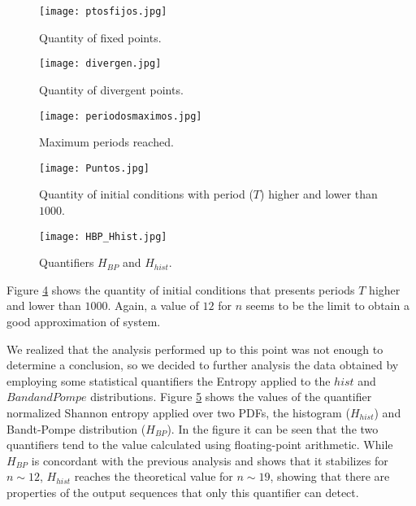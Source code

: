 \documentclass[conference]{IEEEtran}
\begin{document}
\begin{figure}
    \centering
    \texttt{[image: ptosfijos.jpg]}\\
    \caption{Quantity of fixed points.}
    \label{puntosfijos}

\end{figure}

\begin{figure}
    \centering
    \texttt{[image: divergen.jpg]}\\
    \caption{Quantity of divergent points.}\label{puntosdivergentes}

\end{figure}

\begin{figure}
    \centering
        \texttt{[image: periodosmaximos.jpg]}\\
    \caption{Maximum periods reached.}\label{periodosmaximos}

\end{figure}




\begin{figure}
    \centering
        \texttt{[image: Puntos.jpg]}\\
    \caption{Quantity of initial conditions with period ($T$) higher and lower than $1000$.}\label{puntos}

\end{figure}



\begin{figure}
    \centering
        \texttt{[image: HBP\_Hhist.jpg]}\\
    \caption{Quantifiers $H_{BP}$  and $H_{hist}$.}\label{HBPHhist}

\end{figure}


Figure \ref{puntos} shows the quantity of initial conditions that
presents periods $T$ higher and lower than $1000$. Again, a value
of $12$ for $n$ seems to be the limit to obtain a good
approximation of system.

%
We realized that the analysis performed up to this point was not
enough to determine a conclusion, so we decided to further
analysis the data obtained by employing some statistical
quantifiers the Entropy applied to the $hist$ and $Band and Pompe$
distributions. Figure \ref{HBPHhist} shows the values of the
quantifier normalized Shannon entropy applied over two PDFs, the
histogram ($H_{hist}$) and Bandt-Pompe distribution ($H_{BP}$). In
the figure it can be seen that the two quantifiers tend to the
value calculated using floating-point arithmetic. While $H_{BP}$
is concordant with the previous analysis and shows that it
stabilizes for $n \sim 12$, $H_{hist}$ reaches the theoretical
value for $n \sim 19$, showing that there are properties of the
output sequences that only this quantifier can detect.
\end{document}
